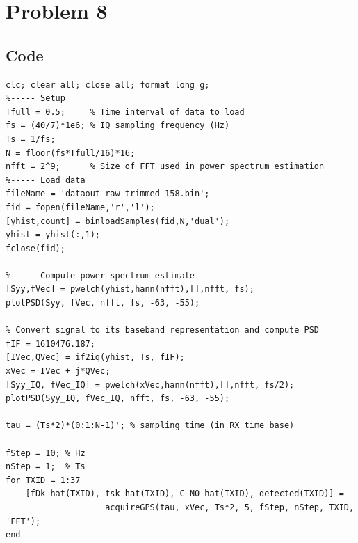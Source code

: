 \section{Problem 8}

\subsection{Code}

\begin{lstlisting}
clc; clear all; close all; format long g;
%----- Setup
Tfull = 0.5;     % Time interval of data to load
fs = (40/7)*1e6; % IQ sampling frequency (Hz)
Ts = 1/fs;
N = floor(fs*Tfull/16)*16;
nfft = 2^9;      % Size of FFT used in power spectrum estimation
%----- Load data
fileName = 'dataout_raw_trimmed_158.bin';
fid = fopen(fileName,'r','l');
[yhist,count] = binloadSamples(fid,N,'dual');
yhist = yhist(:,1);
fclose(fid);

%----- Compute power spectrum estimate
[Syy,fVec] = pwelch(yhist,hann(nfft),[],nfft, fs);
plotPSD(Syy, fVec, nfft, fs, -63, -55);

% Convert signal to its baseband representation and compute PSD
fIF = 1610476.187;
[IVec,QVec] = if2iq(yhist, Ts, fIF);
xVec = IVec + j*QVec;
[Syy_IQ, fVec_IQ] = pwelch(xVec,hann(nfft),[],nfft, fs/2);
plotPSD(Syy_IQ, fVec_IQ, nfft, fs, -63, -55);

tau = (Ts*2)*(0:1:N-1)'; % sampling time (in RX time base)

fStep = 10; % Hz
nStep = 1;  % Ts
for TXID = 1:37
    [fDk_hat(TXID), tsk_hat(TXID), C_N0_hat(TXID), detected(TXID)] = 
                    acquireGPS(tau, xVec, Ts*2, 5, fStep, nStep, TXID, 'FFT');
end
\end{lstlisting}

